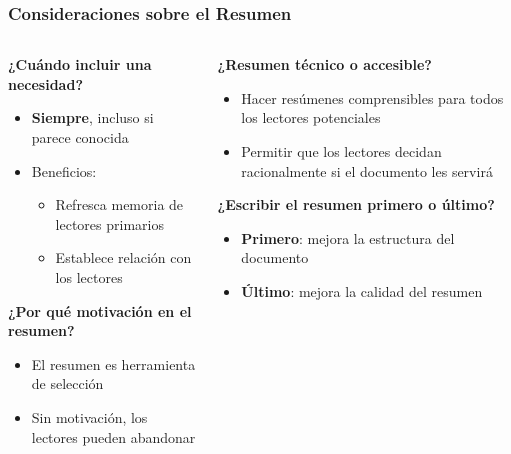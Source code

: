 \documentclass{beamer}
\begin{document}
\begin{frame}
\frametitle{Consideraciones sobre el Resumen}

\begin{columns}[T]
\begin{column}{0.48\textwidth}
\textbf{¿Cuándo incluir una necesidad?}
\begin{itemize}
    \item \textbf{Siempre}, incluso si parece conocida
    \item Beneficios:
    \begin{itemize}
        \item Refresca memoria de lectores primarios
        \item Establece relación con los lectores
    \end{itemize}
\end{itemize}

\vspace{0.1cm}
\textbf{¿Por qué motivación en el resumen?}
\begin{itemize}
    \item El resumen es herramienta de selección
    \item Sin motivación, los lectores pueden abandonar
\end{itemize}
\end{column}

\begin{column}{0.48\textwidth}
\textbf{¿Resumen técnico o accesible?}
\begin{itemize}
    \item Hacer resúmenes comprensibles para todos los lectores potenciales
    \item Permitir que los lectores decidan racionalmente si el documento les servirá
\end{itemize}

\vspace{0.1cm}
\textbf{¿Escribir el resumen primero o último?}
\begin{itemize}
    \item \textbf{Primero}: mejora la estructura del documento
    \item \textbf{Último}: mejora la calidad del resumen
\end{itemize}
\end{column}
\end{columns}

\end{frame}
\end{document}
